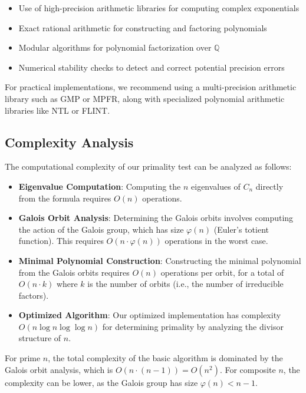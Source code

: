 \begin{itemize}
\item Use of high-precision arithmetic libraries for computing complex exponentials
\item Exact rational arithmetic for constructing and factoring polynomials
\item Modular algorithms for polynomial factorization over $\mathbb{Q}$
\item Numerical stability checks to detect and correct potential precision errors
\end{itemize}

For practical implementations, we recommend using a multi-precision arithmetic library such as GMP or MPFR, along with specialized polynomial arithmetic libraries like NTL or FLINT.

\subsection{Complexity Analysis}

The computational complexity of our primality test can be analyzed as follows:

\begin{itemize}
\item \textbf{Eigenvalue Computation}: Computing the $n$ eigenvalues of $C_n$ directly from the formula requires $O(n)$ operations.

\item \textbf{Galois Orbit Analysis}: Determining the Galois orbits involves computing the action of the Galois group, which has size $\varphi(n)$ (Euler's totient function). This requires $O(n \cdot \varphi(n))$ operations in the worst case.

\item \textbf{Minimal Polynomial Construction}: Constructing the minimal polynomial from the Galois orbits requires $O(n)$ operations per orbit, for a total of $O(n \cdot k)$ where $k$ is the number of orbits (i.e., the number of irreducible factors).

\item \textbf{Optimized Algorithm}: Our optimized implementation has complexity $O(n \log n \log \log n)$ for determining primality by analyzing the divisor structure of $n$.
\end{itemize}

For prime $n$, the total complexity of the basic algorithm is dominated by the Galois orbit analysis, which is $O(n \cdot (n-1)) = O(n^2)$. For composite $n$, the complexity can be lower, as the Galois group has size $\varphi(n) < n-1$.

